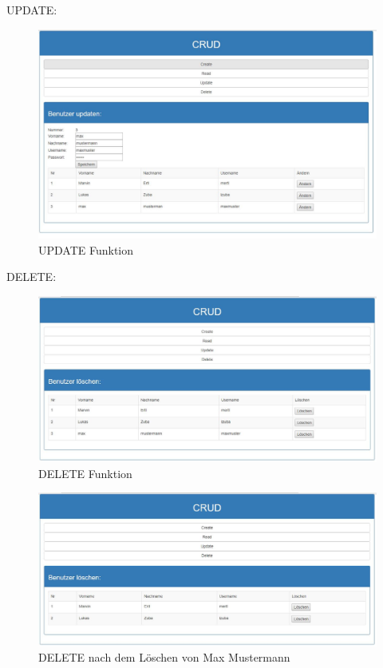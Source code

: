 UPDATE:
\begin{figure}[!h]
\centering
\includegraphics[width=0.9\linewidth]{images/update}
\caption{UPDATE Funktion}
\label{fig:update}
\end{figure}
\clearpage
DELETE:
\begin{figure}[!h]
\centering
\includegraphics[width=1\linewidth]{images/delete}
\caption{DELETE Funktion}
\label{fig:delete}
\end{figure}

\begin{figure}[!h]
\centering
\includegraphics[width=1\linewidth]{images/delete_after}
\caption{DELETE nach dem Löschen von Max Mustermann}
\label{fig:deleteafter}
\end{figure}

